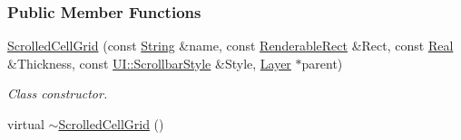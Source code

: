 \subsubsection*{Public Member Functions}
\begin{DoxyCompactItemize}
\item 
\hyperlink{classMezzanine_1_1UI_1_1ScrolledCellGrid_aa8747a6e983ad69e6c7144f8c62f607e}{ScrolledCellGrid} (const \hyperlink{namespaceMezzanine_acf9fcc130e6ebf08e3d8491aebcf1c86}{String} \&name, const \hyperlink{structMezzanine_1_1UI_1_1RenderableRect}{RenderableRect} \&Rect, const \hyperlink{namespaceMezzanine_a726731b1a7df72bf3583e4a97282c6f6}{Real} \&Thickness, const \hyperlink{namespaceMezzanine_1_1UI_a5998a9bf372a7e92605c0c461736e763}{UI::ScrollbarStyle} \&Style, \hyperlink{classMezzanine_1_1UI_1_1Layer}{Layer} $\ast$parent)
\begin{DoxyCompactList}\small\item\em Class constructor. \item\end{DoxyCompactList}\item 
\hypertarget{classMezzanine_1_1UI_1_1ScrolledCellGrid_a9c082813befaac18d17480a7fe6efe69}{
virtual \hyperlink{classMezzanine_1_1UI_1_1ScrolledCellGrid_a9c082813befaac18d17480a7fe6efe69}{$\sim$ScrolledCellGrid} ()}
\label{classMezzanine_1_1UI_1_1ScrolledCellGrid_a9c082813befaac18d17480a7fe6efe69}


\end{DoxyCompactItemize}
